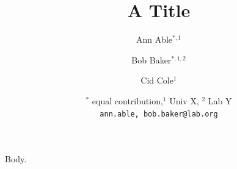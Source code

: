 \documentclass{article}
\begin{document}
\title{A Title}
\author{Ann Able$^{\ast, 1}$
\and Bob Baker$^{\ast, 1,2}$
\and Cid Cole$^{1}$
\and $^{\ast}$ equal contribution,$^{1}$ Univ X, $^{2}$ Lab Y\\
{\tt\small ann.able, bob.baker@lab.org}
}
\maketitle
Body.
\end{document}
